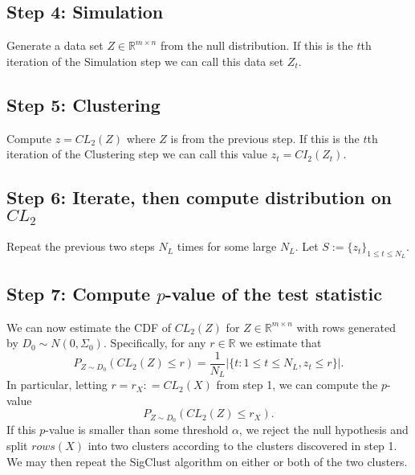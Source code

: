 \documentclass{article}
\begin{document}
\subsection{Step 4: Simulation}
 Generate a data set $Z\in \mathbb{R}^{m \times n}$ from the null distribution.  If this is the $t$th iteration of the Simulation step we can call this data set $Z_t$.
 
\subsection{Step 5: Clustering}  Compute $z = CL_{2}(Z)$ where $Z$ is from the previous step.  If this is the $t$th iteration of the Clustering step we can call this value $z_t = CI_{2}(Z_t)$.

\subsection{Step 6: Iterate, then compute distribution on $CL_{2}$}  
Repeat the previous two steps $N_{L}$ times for some large $N_{L}$.  Let $S:=\{z_{t}\}_{1\leq t\leq N_{L}}.$\\
\subsection{Step 7:  Compute $p$-value of the test statistic}
\indent We can now estimate the CDF of $CL_{2}(Z)$ for $Z\in \mathbb{R}^{m \times n}$ with rows generated by $D_{0} \sim N(0, \Sigma_0)$.  Specifically, for any $r\in \mathbb{R}$ we estimate that
$$P_{Z\sim D_{0}}(CL_{2}(Z) \leq r) = \frac{1}{N_{L}} \lvert \{ t: 1 \leq t \leq N_{L}, z_t \leq r \} \vert.$$
In particular, letting $r=r_X: = CL_{2}(X)$ from step 1, we can compute the $p$-value $$P_{Z\sim D_{0}}(CL_{2}(Z) \leq r_{X}).$$
If this $p$-value is smaller than some threshold $\alpha$, we reject the null hypothesis and split  $rows(X)$ into two clusters according to the clusters discovered in step 1.   We may then repeat the SigClust algorithm on either or both of the two clusters.
\end{document}
